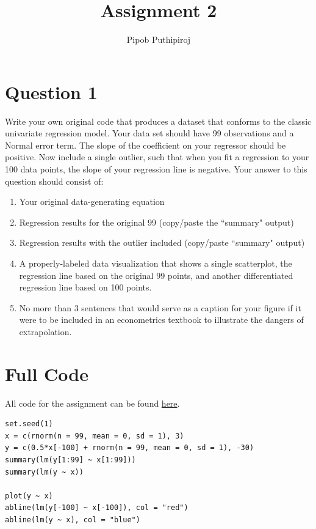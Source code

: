 \documentclass[11pt, oneside]{article}
\title{Assignment 2}
\author{Pipob Puthipiroj}
\begin{document}
\date{}
\maketitle

\section*{Question 1}
Write your own original code that produces a dataset that conforms to the classic univariate regression model. Your data set should have 99 observations and a Normal error term. The slope of the coefficient on your regressor should be positive. Now include a single outlier, such that when you fit a regression to your 100 data points, the slope of your regression line is negative.  Your answer to this question should consist of:
\begin{enumerate}[label=(\alph*)]
	\item Your original data-generating equation 
	\item Regression results for the original 99 (copy/paste the ``summary" output) 
	\item Regression results with the outlier included (copy/paste ``summary" output)
	\item A properly-labeled data visualization that shows a single scatterplot, the regression line based on the original 99 points, and another differentiated regression line based on 100 points.
	\item No more than 3 sentences that would serve as a caption for your figure if it were to be included in an econometrics textbook to illustrate the dangers of extrapolation.
	\end{enumerate}
	\section*{Full Code}
	All code for the assignment can be found \href{https://github.com/thetruejacob/CS112/blob/master/Assignment/Assignment\%202.ipynb}{here}.
	\begin{verbatim}
set.seed(1)
x = c(rnorm(n = 99, mean = 0, sd = 1), 3)
y = c(0.5*x[-100] + rnorm(n = 99, mean = 0, sd = 1), -30)
summary(lm(y[1:99] ~ x[1:99]))
summary(lm(y ~ x))

plot(y ~ x)
abline(lm(y[-100] ~ x[-100]), col = "red")
abline(lm(y ~ x), col = "blue")
\end{verbatim}
\newpage
\end{document}
